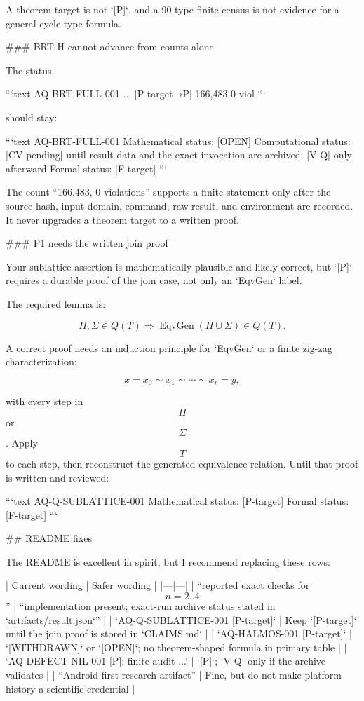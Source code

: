 A theorem target is not `[P]`, and a 90-type finite census is not evidence for a general cycle-type formula.

### BRT-H cannot advance from counts alone

The status

```text
AQ-BRT-FULL-001 ... [P-target→P] 166,483 0 viol
```

should stay:

```text
AQ-BRT-FULL-001
Mathematical status: [OPEN]
Computational status: [CV-pending] until result data and
the exact invocation are archived; [V-Q] only afterward
Formal status: [F-target]
```

The count “166,483, 0 violations” supports a finite statement only after the source hash, input domain, command, raw result, and environment are recorded. It never upgrades a theorem target to a written proof.

### P1 needs the written join proof

Your sublattice assertion is mathematically plausible and likely correct, but `[P]` requires a durable proof of the join case, not only an `EqvGen` label.

The required lemma is:

$$
\Pi,\Sigma\in Q(T)
\Longrightarrow
\operatorname{EqvGen}(\Pi\cup\Sigma)\in Q(T).
$$

A correct proof needs an induction principle for `EqvGen` or a finite zig-zag characterization:

$$
x=x_0\sim x_1\sim\cdots\sim x_r=y,
$$

with every step in $$\Pi$$ or $$\Sigma$$. Apply $$T$$ to each step, then reconstruct the generated equivalence relation. Until that proof is written and reviewed:

```text
AQ-Q-SUBLATTICE-001
Mathematical status: [P-target]
Formal status: [F-target]
```

## README fixes

The README is excellent in spirit, but I recommend replacing these rows:

| Current wording | Safer wording |
|---|---|
| “reported exact checks for $$n=2..4$$” | “implementation present; exact-run archive status stated in `artifacts/result.json`” |
| `AQ-Q-SUBLATTICE-001 [P-target]` | Keep `[P-target]` until the join proof is stored in `CLAIMS.md` |
| `AQ-HALMOS-001 [P-target]` | `[WITHDRAWN]` or `[OPEN]`; no theorem-shaped formula in primary table |
| `AQ-DEFECT-NIL-001 [P]; finite audit ...` | `[P]`; `V-Q` only if the archive validates |
| “Android-first research artifact” | Fine, but do not make platform history a scientific credential |

